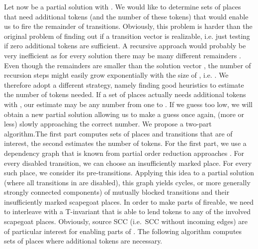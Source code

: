\documentclass{LMCS}
\begin{document}
Let  now be a partial solution with . We would like to determine sets of places that need additional tokens
(and the number of these tokens) that would enable us to fire the remainder  of transitions. Obviously, this problem is harder
than the original problem of finding out if a transition vector is realizable, i.e. just testing if zero additional tokens are
sufficient. A recursive approach would probably be very inefficient as for every solution  there may be many different remainders .
Even though the remainders are smaller than the solution vector , the number of recursion steps might easily grow exponentially with
the size of , i.e. . We therefore adopt a different strategy, namely finding good heuristics to estimate the number of
tokens needed. If a set of places actually needs  additional tokens with , our estimate may be any number from one to .
If we guess too low, we will obtain a new partial solution allowing us to make a guess once again, (more or less) slowly approaching
the correct number. We propose a two-part algorithm.The first part computes sets of places and transitions that are of interest, the second
estimates the number of tokens. For the first part, we use a dependency graph that is known from partial order reduction approaches \cite{valmari2009}.
For every disabled transition, we can choose an insufficiently marked place. For every such place, we consider its pre-transitions. Applying this
idea to a partial solution (where all transitions in  are disabled), this graph yields cycles, or more generally strongly connected components) of mutually blocked 
transitions and their insufficiently marked scapegoat places. In order to make parts of  fireable, we need to interleave  with a T-invariant that
is able to lend tokens to any of the involved scapegoat places. Obviously, source SCC (i.e.~SCC without incoming edges) are of particular
interest for enabling parts of . The following algorithm computes sets of places where additional tokens are necessary.

\smallskip
\end{document}
